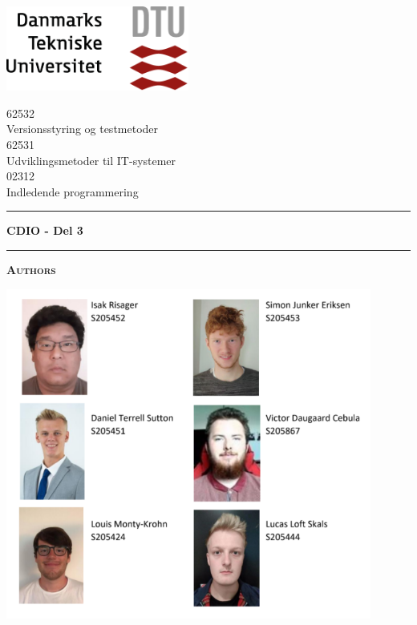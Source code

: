 \begin{titlepage}
\begin{center}
\begin{multicols}{2}
\addtolength{\topmargin}{-.5cm}

\includegraphics[width=0.45\textwidth]{root/dtu.png}~\\
\vspace{.5cm}


62532\\ Versionsstyring og testmetoder \\
\vspace{.2cm}
62531\\ Udviklingsmetoder til IT-systemer \\
\vspace{.2cm}
02312\\ Indledende programmering \\
\end{multicols}{}
\vspace{.5cm}

\hrule
\vspace{.5cm}
{ \huge \bfseries  CDIO - Del 3} %
\vspace{.5cm}

\hrule
\vspace{1cm}

\textsc{\textbf{Authors}}\\

\begin{center}

\includegraphics[width=0.9\textwidth]{Report/ProfilePictures/Forsidebilleder_vert.png}\\


\end{center}
\end{center}
\end{titlepage}
